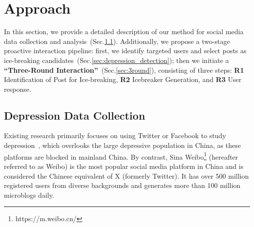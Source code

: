 \section{Approach}
\label{sec:approach}
In this section, we provide a detailed description of our method for social media data collection and analysis~(Sec.\ref{sec:collect_data}). Additionally, we propose a two-stage proactive interaction pipeline: first, we identify targeted users and select posts as ice-breaking candidates~(Sec.\ref{sec:depression_detection}); then we initiate a \textbf{``Three-Round Interaction''}~(Sec.\ref{sec:3round}), consisting of three steps: \textbf{R1} Identification of Post for Ice-breaking, \textbf{R2} Icebreaker Generation, and \textbf{R3} User response.


\subsection{Depression Data Collection}
\label{sec:collect_data}
Existing research primarily focuses on using Twitter or Facebook to study depression~\cite{sadeque2018measuring}, which overlooks the large depressive population in China, as these platforms are blocked in mainland China. By contrast, Sina Weibo\footnote{https://m.weibo.cn/} (hereafter referred to as Weibo) is the most popular social media platform in China and is considered the Chinese equivalent of X (formerly Twitter). It has over 500 million registered users from diverse backgrounds and generates more than 100 million microblogs daily.

